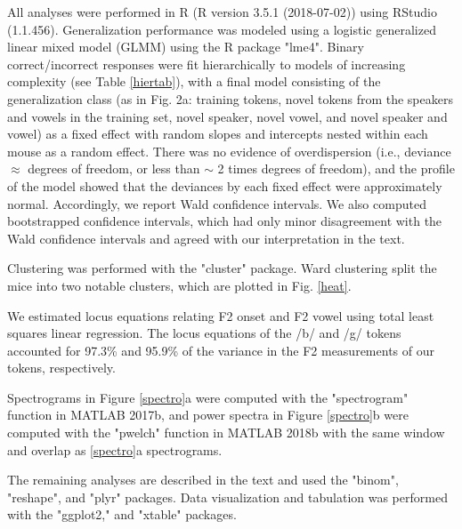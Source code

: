 \documentclass[preprint, NumberedRefs]{JASAnew}\usepackage[]{graphicx}\usepackage[]{color}
\begin{document}
All analyses were performed in R (R version 3.5.1 (2018-07-02))\cite{Team2016} using RStudio (1.1.456)\cite{Team2015}. Generalization performance was modeled using a logistic generalized linear mixed model (GLMM) using the R package "lme4"\cite{Bates2015}. Binary correct/incorrect responses were fit hierarchically to models of increasing complexity (see Table \ref{hiertab}), with a final model consisting of the generalization class (as in Fig. 2a: training tokens, novel tokens from the speakers and vowels in the training set, novel speaker, novel vowel, and novel speaker and vowel) as a fixed effect with random slopes and intercepts nested within each mouse as a random effect. There was no evidence of overdispersion (i.e., deviance $\approx$ degrees of freedom, or less than  $\sim$ 2 times degrees of freedom), and the profile of the model showed that the deviances by each fixed effect were approximately normal. Accordingly, we report Wald confidence intervals. We also computed bootstrapped confidence intervals, which had only minor disagreement with the Wald confidence intervals and agreed with our interpretation in the text.

Clustering was performed with the "cluster"\cite{Maechler2017} package. Ward clustering split the mice into two notable clusters, which are plotted in Fig. \ref{heat}.

We estimated locus equations relating F2 onset and F2 vowel using total least squares linear regression. The locus equations of the /b/ and /g/ tokens accounted for 97.3\% and 95.9\% of the variance in the F2 measurements of our tokens, respectively.

Spectrograms in Figure \ref{spectro}a were computed with the "spectrogram" function in MATLAB 2017b, and power spectra in Figure \ref{spectro}b were computed with the "pwelch" function in MATLAB 2018b with the same window and overlap as \ref{spectro}a spectrograms.

The remaining analyses are described in the text and used the "binom"\cite{Sundar2014}, "reshape"\cite{Wickham2007}, and "plyr"\cite{Wickham2011} packages. Data visualization and tabulation was performed with the "ggplot2,"\cite{Wickham2009} and "xtable"\cite{Dahl2016} packages.
\end{document}
